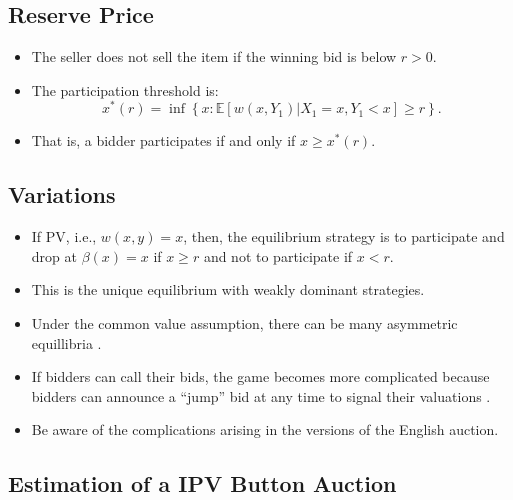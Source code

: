 \documentclass[
]{book}
\providecommand{\tightlist}{%
  \setlength{\itemsep}{0pt}\setlength{\parskip}{0pt}}
\begin{document}
\hypertarget{reserve-price}{%
\subsection{Reserve Price}\label{reserve-price}}

\begin{itemize}
\tightlist
\item
  The seller does not sell the item if the winning bid is below \(r > 0\).
\item
  The participation threshold is:
  \[
  x^*(r) = \inf\left\{x: \mathbb{E}[w(x, Y_1)| X_1 = x, Y_1 < x] \ge r\right\}.
  \]
\item
  That is, a bidder participates if and only if \(x \ge x^*(r)\).
\end{itemize}

\hypertarget{variations}{%
\subsection{Variations}\label{variations}}

\begin{itemize}
\tightlist
\item
  If PV, i.e., \(w(x, y) = x\), then, the equilibrium strategy is to participate and drop at \(\beta(x) = x\) if \(x \ge r\) and not to participate if \(x < r\).
\item
  This is the unique equilibrium with weakly dominant strategies.
\item
  Under the common value assumption, there can be many asymmetric equillibria \citep{milgromRationalExpectationsInformation1981, bikhchandaniEquilibriaOpenCommon1991}.
\item
  If bidders can call their bids, the game becomes more complicated because bidders can announce a ``jump'' bid at any time to signal their valuations \citep{averyStrategicJumpBidding1998}.
\item
  Be aware of the complications arising in the versions of the English auction.
\end{itemize}

\hypertarget{estimation-of-a-ipv-button-auction}{%
\subsection{Estimation of a IPV Button Auction}\label{estimation-of-a-ipv-button-auction}}
\end{document}

